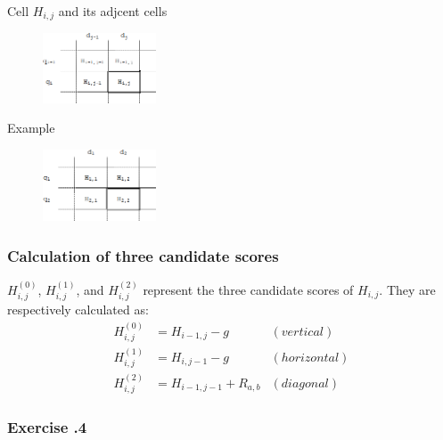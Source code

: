 \begin{multicols}{2}

Cell $H_{i, j}$ and its adjcent cells
\begin{figure}[H]
  \centering
      \includegraphics[width=0.3\textwidth]{fig02/dynamic_programmoing_cell_indices.png}
\end{figure}

Example
\begin{figure}[H]
  \centering
      \includegraphics[width=0.3\textwidth]{fig02/dynamic_programmoing_cell_indices_example.png}
\end{figure}

\end{multicols} 

%
%	
\subsubsection*{Calculation of three candidate scores}
$H_{i,j}^{(0)}$, $H_{i,j}^{(1)}$, and $H_{i,j}^{(2)}$ represent the three candidate scores of $H_{i,j}$. They are respectively calculated as:
\begin{align*}
H_{i,j}^{(0)} &= H_{i-1,j} - g &(vertical) \\
H_{i,j}^{(1)} &= H_{i,j-1} - g	&(horizontal) \\
H_{i,j}^{(2)} &= H_{i-1,j-1} + R_{a,b} &(diagonal)
\end{align*}

%
%
\subsubsection*{Exercise \thesection.4}

